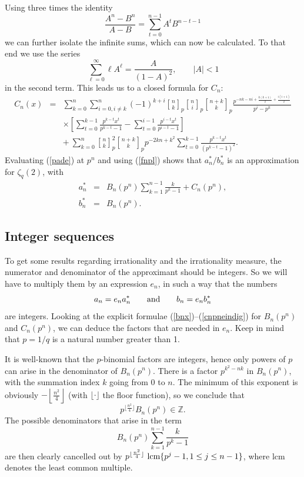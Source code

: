 \documentclass[12pt]{article}
\def \qbinom#1#2{\genfrac{[}{]}{0pt}{}{#1}{#2}}
\numberwithin{equation}{section}
\begin{document}
Using three times the identity
\[\frac{A^n-B^n}{A-B}=\sum_{t=0}^{n-1}A^tB^{n-t-1}\]
we can further isolate the infinite sums, which can now be
calculated.  To that end we use the series
\[\sum_{\ell=0}^\infty \ell A^\ell=\frac{A}{(1-A)^2}, \qquad |A| < 1  \]
in the second term.  This leads us to a closed formula for $C_n$:
\begin{eqnarray}
\nonumber C_n(x)&=&\sum_{k=0}^n\sum_{i=0,i\neq k}^n(-1)^{k+i}
\qbinom{n}{k}_{p} \qbinom{n}{i}_{p} \qbinom{n+k}{k}_{p} \frac{p^{-nk-ni+\frac{k(k+1)}{2}+\frac{i(i+1)}{2}}}{p^i-p^k}\\
\nonumber & &\times \left[\sum_{t=0}^{k-1} \frac{p^{k-t}x^t}{p^{k-t}-1}
 -\sum_{t=0}^{i-1} \frac{p^{i-t}x^t}{p^{i-t}-1}\right]
\\
\label{cnpneindig} & &+\ \sum_{k=0}^n \qbinom{n}{k}_{p}^2 \qbinom{n+k}{k}_{p} p^{-2kn+k^2}
\sum_{t=0}^{k-1} \frac{p^{k-t}x^t}{(p^{k-t}-1)^2}.
\end{eqnarray}
Evaluating (\ref{pade}) at $p^n$ and using (\ref{fnpl}) shows that
${a_n^*}/{b_n^*}$ is an approximation for
$\zeta_q(2)$, with
\begin{eqnarray}\label{anster}
a_n^*&=&B_n(p^n)\sum_{k=1}^{n-1}\frac{k}{p^k-1}+C_n(p^n), \\
\label{bnster} b_n^*&=&B_n(p^n).
\end{eqnarray}

\subsection{Integer sequences}

To get some results regarding irrationality and the irrationality
measure, the numerator and denominator of the approximant should
be integers. So we will have to multiply them by an expression
$e_n$, in such a way that the numbers
\begin{equation}\label{bnan}
a_n=e_na_n^*\qquad{\rm and}\qquad b_n=e_nb_n^*
\end{equation}
are integers.
Looking at the explicit formulae (\ref{bnx})--(\ref{cnpneindig}) for $B_n(p^n)$ and
$C_n(p^n)$, we can deduce the factors that are needed in $e_n$.  Keep in mind that
$p=1/q$ is a natural number greater
than 1.

It is well-known that the $p$-binomial factors are integers, hence
only powers of $p$ can arise in the denominator of $B_n(p^n)$.
There is a factor $p^{k^2-nk}$ in $B_n(p^n)$, with the summation
index $k$ going from $0$ to $n$.  The minimum of this exponent is
obviously $-\left\lfloor \frac{n^2}{4}\right\rfloor$ (with
$\lfloor \cdot \rfloor$ the floor function), so we conclude that
\[p^{\lfloor\frac{n^2}{4}\rfloor}B_n(p^n)\in\mathbb{Z}.\]
The possible denominators that arise in the term
\[B_n(p^n)\sum_{k=1}^{n-1}\frac{k}{p^k-1}\]
are then clearly cancelled out by $p^{\lfloor
\frac{n^2}{4}\rfloor}\ {\rm lcm}\{p^j-1,1\leq j\leq n-1\}$, where lcm denotes the least common multiple.
\end{document}
